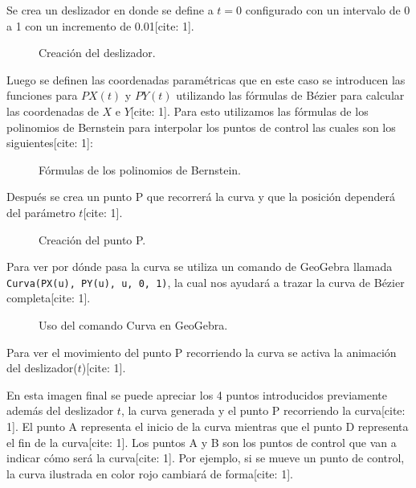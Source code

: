 \documentclass[12pt,letterpaper]{article}
\begin{document}
Se crea un deslizador en donde se define a $t = 0$ configurado con un intervalo de 0 a 1 con un incremento de 0.01[cite: 1].

\begin{figure}[H]
    \centering
    \caption{Creación del deslizador.}
    \label{fig:deslizador}
\end{figure}

Luego se definen las coordenadas paramétricas que en este caso se introducen las funciones para $PX(t)$ y $PY(t)$ utilizando las fórmulas de Bézier para calcular las coordenadas de $X$ e $Y$[cite: 1]. Para esto utilizamos las fórmulas de los polinomios de Bernstein para interpolar los puntos de control las cuales son los siguientes[cite: 1]:

\begin{figure}[H]
    \centering
    \caption{Fórmulas de los polinomios de Bernstein.}
    \label{fig:bernstein}
\end{figure}

Después se crea un punto P que recorrerá la curva y que la posición dependerá del parámetro $t$[cite: 1].

\begin{figure}[H]
    \centering
    \caption{Creación del punto P.}
    \label{fig:punto_p}
\end{figure}

Para ver por dónde pasa la curva se utiliza un comando de GeoGebra llamada \texttt{Curva(PX(u), PY(u), u, 0, 1)}, la cual nos ayudará a trazar la curva de Bézier completa[cite: 1].

\begin{figure}[H]
    \centering
    \caption{Uso del comando Curva en GeoGebra.}
    \label{fig:comando_curva}
\end{figure}

Para ver el movimiento del punto P recorriendo la curva se activa la animación del deslizador($t$)[cite: 1].

En esta imagen final se puede apreciar los 4 puntos introducidos previamente además del deslizador $t$, la curva generada y el punto P recorriendo la curva[cite: 1]. El punto A representa el inicio de la curva mientras que el punto D representa el fin de la curva[cite: 1]. Los puntos A y B son los puntos de control que van a indicar cómo será la curva[cite: 1]. Por ejemplo, si se mueve un punto de control, la curva ilustrada en color rojo cambiará de forma[cite: 1].
\end{document}

